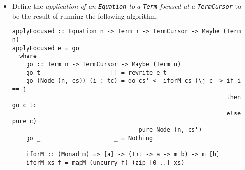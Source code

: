 \documentclass[11pt]{report}
\newcommand{\haskell}[1]{\texttt{#1}}
\begin{document}
\begin{itemize}
\item {%
  Define the
  \textit{application of an \haskell{Equation} to a \haskell{Term} focused at a \haskell{TermCursor}}
  to be the result of running the following algorithm:

  \vspace{-0.5em}
  \begin{verbatim}
applyFocused :: Equation n -> Term n -> TermCursor -> Maybe (Term n)
applyFocused e = go
  where
    go :: Term n -> TermCursor -> Maybe (Term n)
    go t                    [] = rewrite e t
    go (Node (n, cs)) (i : tc) = do cs' <- iforM cs (\j c -> if i == j
                                                             then go c tc
                                                             else pure c)
                                    pure Node (n, cs')
    go _                     _ = Nothing

    iforM :: (Monad m) => [a] -> (Int -> a -> m b) -> m [b]
    iforM xs f = mapM (uncurry f) (zip [0 ..] xs)
  \end{verbatim}

}
\end{itemize}
\end{document}
